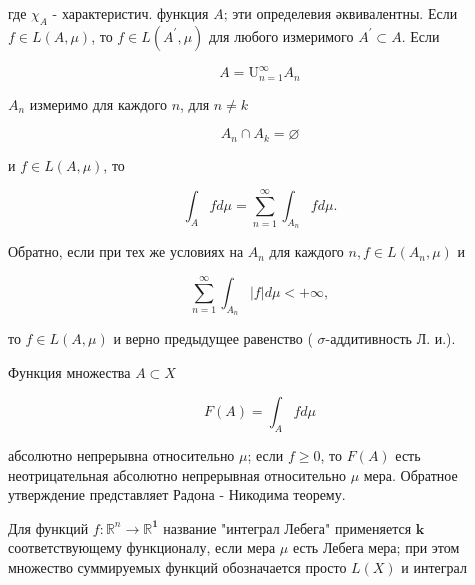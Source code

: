 \documentclass[10pt]{article}
\begin{document}
где $\chi_{A}$ - характеристич. функция $A$; эти определевия әквивалентны. Если $f \in L(A, \mu)$, то $f \in L\left(A^{\prime}, \mu\right)$ для любого измеримого $A^{\prime} \subset A$. Если



\[

A=\mathrm{U}_{n=1}^{\infty} A_{n}

\]



$A_{n}$ измеримо для каждого $n$, для $n \neq k$



\[

A_{n} \cap A_{k}=\varnothing

\]



и $f \in L(A, \mu)$, то



\[

\int_{A} f d \mu=\sum_{n=1}^{\infty} \int_{A_{n}} f d \mu .

\]



Обратно, если при тех же условиях на $A_{n}$ для каждого $n, f \in L\left(A_{n}, \mu\right)$ и



\[

\sum_{n=1}^{\infty} \int_{A_{n}}|f| d \mu<+\infty,

\]



то $f \in L(A, \mu)$ и верно предыдущее равенство ( $\sigma$-аддитивность Л. и.).



Функция множества $A \subset X$



\[

F(A)=\int_{A} f d \mu

\]



абсолютно непрерывна относительно $\mu$; если $f \geqslant 0$, то $F(A)$ есть неотрицательная абсолютно непрерывная относительно $\mu$ мера. Обратное утверждение представляет Радона - Никодима теорему.



Для функций $f: \mathbb{R}^{n} \rightarrow \mathbb{R}^{\mathbf{1}}$ название "интеграл Лебега" применяется $\boldsymbol{k}$ соответствующему функционалу, если мера $\mu$ есть Лебега мера; при этом множество суммируемых функций обозначается просто $L(X)$ и интеграл
\end{document}
